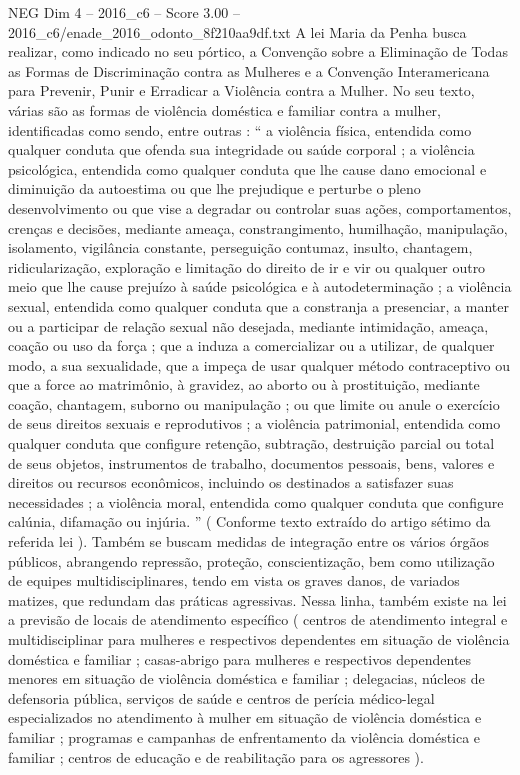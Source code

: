 \begin{textsample}{NEG Dim 4 – 2016\_c6 – Score 3.00 – 2016\_c6/enade\_2016\_odonto\_8f210aa9df.txt}
A lei Maria da Penha busca realizar, como indicado no seu pórtico, a Convenção sobre a Eliminação de Todas as Formas de Discriminação contra as Mulheres e a Convenção Interamericana para Prevenir, Punir e Erradicar a Violência contra a Mulher.
No seu texto, várias são as formas de violência doméstica e familiar contra a mulher, identificadas como sendo, entre outras : “ a violência física, entendida como qualquer conduta que ofenda sua integridade ou saúde corporal ; a violência psicológica, entendida como qualquer conduta que lhe cause dano emocional e diminuição da autoestima ou que lhe prejudique e perturbe o pleno desenvolvimento ou que vise a degradar ou controlar suas ações, comportamentos, crenças e decisões, mediante ameaça, constrangimento, humilhação, manipulação, isolamento, vigilância constante, perseguição contumaz, insulto, chantagem, ridicularização, exploração e limitação do direito de ir e vir ou qualquer outro meio que lhe cause prejuízo à saúde psicológica e à autodeterminação ; a violência sexual, entendida como qualquer conduta que a constranja a presenciar, a manter ou a participar de relação sexual não desejada, mediante intimidação, ameaça, coação ou uso da força ; que a induza a comercializar ou a utilizar, de qualquer modo, a sua sexualidade, que a impeça de usar qualquer método contraceptivo ou que a force ao matrimônio, à gravidez, ao aborto ou à prostituição, mediante coação, chantagem, suborno ou manipulação ; ou que limite ou anule o exercício de seus direitos sexuais e reprodutivos ; a violência patrimonial, entendida como qualquer conduta que configure retenção, subtração, destruição parcial ou total de seus objetos, instrumentos de trabalho, documentos pessoais, bens, valores e direitos ou recursos econômicos, incluindo os destinados a satisfazer suas necessidades ; a violência moral, entendida como qualquer conduta que configure calúnia, difamação ou injúria. ” ( Conforme texto extraído do artigo sétimo da referida lei ).
Também se buscam medidas de integração entre os vários órgãos públicos, abrangendo repressão, proteção, conscientização, bem como utilização de equipes multidisciplinares, tendo em vista os graves danos, de variados matizes, que redundam das práticas agressivas.
Nessa linha, também existe na lei a previsão de locais de atendimento específico ( centros de atendimento integral e multidisciplinar para mulheres e respectivos dependentes em situação de violência doméstica e familiar ; casas-abrigo para mulheres e respectivos dependentes menores em situação de violência doméstica e familiar ; delegacias, núcleos de defensoria pública, serviços de saúde e centros de perícia médico-legal especializados no atendimento à mulher em situação de violência doméstica e familiar ; programas e campanhas de enfrentamento da violência doméstica e familiar ; centros de educação e de reabilitação para os agressores ).

\end{textsample}
